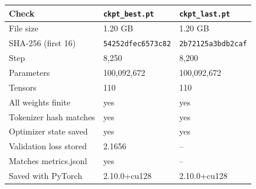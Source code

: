 \begin{tabular}{lll}
\toprule
Check & \texttt{ckpt\_best.pt} & \texttt{ckpt\_last.pt} \\
\midrule
File size & 1.20 GB & 1.20 GB \\
SHA-256 (first 16) & \texttt{54252dfec6573c82} & \texttt{2b72125a3bdb2caf} \\
Step & 8,250 & 8,200 \\
Parameters & 100,092,672 & 100,092,672 \\
Tensors & 110 & 110 \\
All weights finite & yes & yes \\
Tokenizer hash matches & yes & yes \\
Optimizer state saved & yes & yes \\
Validation loss stored & 2.1656 & -- \\
Matches metrics.jsonl & yes & -- \\
Saved with PyTorch & 2.10.0+cu128 & 2.10.0+cu128 \\
\bottomrule
\end{tabular}
